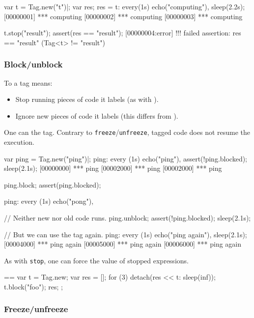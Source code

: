 \begin{urbiscript}[firstnumber=1]
var t = Tag.new("t")|;
var res;
res = t: every(1s) echo("computing"),
sleep(2.2s);
[00000001] *** computing
[00000002] *** computing
[00000003] *** computing

t.stop("result");
assert(res == "result");
[00000004:error] !!! failed assertion: res == "result" (Tag<t> != "result")
\end{urbiscript}


\subsubsection{Block/unblock}
\label{sec:specs:tag:block}

To  a tag means:
\begin{itemize}
\item Stop running pieces of code it labels (as with
  ).
\item Ignore new pieces of code it labels (this differs from
  ).
\end{itemize}

One can  the tag.  Contrary to
\lstinline|freeze|/\lstinline|unfreeze|, tagged code does not resume
the execution.

\begin{urbiscript}[firstnumber=1]
var ping = Tag.new("ping")|;
ping:
  every (1s)
    echo("ping"),
assert(!ping.blocked);
sleep(2.1s);
[00000000] *** ping
[00002000] *** ping
[00002000] *** ping

ping.block;
assert(ping.blocked);

ping:
  every (1s)
    echo("pong"),

// Neither new nor old code runs.
ping.unblock;
assert(!ping.blocked);
sleep(2.1s);

// But we can use the tag again.
ping:
  every (1s)
    echo("ping again"),
sleep(2.1s);
[00004000] *** ping again
[00005000] *** ping again
[00006000] *** ping again
\end{urbiscript}

As with \lstinline|stop|, one can force the value of stopped
expressions.

\begin{urbiassert}
==
{
  var t = Tag.new;
  var res = [];
  for (3)
    detach(res << {t: sleep(inf)});
  t.block("foo");
  res;
};
\end{urbiassert}

\subsubsection{Freeze/unfreeze}
\label{sec:specs:tag:freeze}

